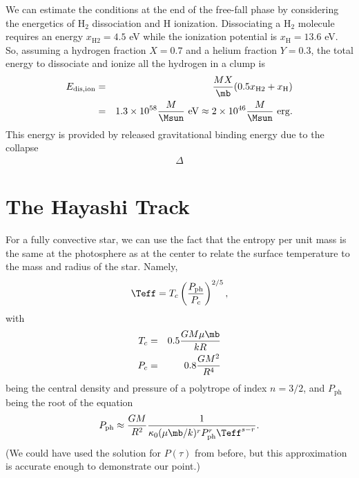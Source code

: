 We can estimate the conditions at the end of the free-fall phase by considering the energetics of H$_2$ dissociation and H ionization.
Dissociating a H$_2$ molecule requires an energy $x_\mathrm{H2}=4.5$ eV while the ionization potential is $x_\mathrm{H}=13.6$ eV.
So, assuming a hydrogen fraction $X=0.7$ and a helium fraction $Y=0.3$, the total energy to dissociate and ionize all the hydrogen in a clump is
\begin{eqnarray*}
  E_\mathrm{dis,ion} &=& \frac{M X}{\mb}(0.5x_\mathrm{H2} + x_\mathrm{H}) \\
  &=& 1.3\times10^{58} \frac{M}{\Msun}\ \mathrm{eV} \approx 2\times10^{46} \frac{M}{\Msun}\ \mathrm{erg}.
\end{eqnarray*}
This energy is provided by released gravitational binding energy due to the collapse
\begin{eqnarray*}
  \Delta
\end{eqnarray*}

\section{The Hayashi Track}\label{s.Hayashi}

For a fully convective star, we can use the fact that the entropy per unit mass is the same at the photosphere as at the center to relate the surface temperature to the mass and radius of the star. Namely,
\begin{equation}\label{e.Teff-adiabat}
\Teff = T_{c}\left(\frac{P_{\mathrm{ph}}}{P_{c}}\right)^{2/5},
\end{equation}
with
\begin{eqnarray}
T_{c} &=& 0.5 \frac{GM\mu \mb}{kR} \label{e.fc-Tc}\\
P_{c} &=& 0.8\frac{GM^{2}}{R^{4}} \label{e.fc-Pc}
\end{eqnarray}
being the central density and pressure of a polytrope of index $n=3/2$, and $P_{\mathrm{ph}}$ being the root of the equation
\begin{equation}\label{e.pph}
 P_{\mathrm{ph}} \approx \frac{GM}{R^{2}}\frac{1}{\kappa_{0}(\mu\mb/k)^{r}P_{\mathrm{ph}}^{r}\Teff^{s-r}}.
\end{equation}
(We could have used the solution for $P(\tau)$ from before, but this approximation is accurate enough to demonstrate our point.)

